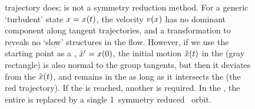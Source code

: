 \begin{figure}
{trajectory does; {\mconn} is not a symmetry reduction method. For a
generic `turbulent' state $x = x(t)$, the velocity $
v(x)$ has no dominant component along tangent trajectories, and
a transformation to {\comovframe} reveals no `slow' structures in the
flow.
%
However, if we use the starting point as a {\template},
$\hat{x}'=x(0)$, the initial motion $\hat{x}(t)$ in the
{\slicePlane} (gray rectangle) is also normal to the group tangents,
but then it deviates from the {\comovframe} $\bar{x}(t)$, and
remains in the {\slicePlane} as long as it intersects the {\wurst}
(the red trajectory). If the {\chartBord} is reached, another
{\slicePlane} is required. In the {\mslices}, the entire
{\wurst} is replaced by a single 1\dmn\ symmetry reduced \statesp\
orbit.
}
\end{figure}



